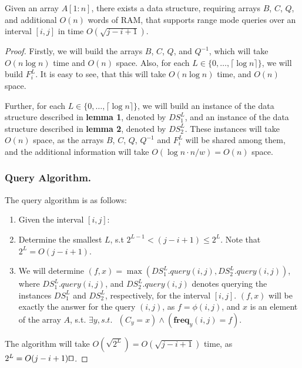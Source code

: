 \documentclass[runningheads]{llncs}
\begin{document}
\begin{theorem} 
    Given an array $A[1:n]$, there exists a data structure, requiring arrays $B$, $C$, $Q$, and additional $O(n)$ words of RAM, that supports 
    range mode queries over an interval $[i,j]$ in time $O(\sqrt{j-i+1})$.
\end{theorem}
\begin{proof}
    Firstly, we will build the arrays $B$, $C$, $Q$, and $Q^{-1}$, which will take $O(n\log n)$ time and $O(n)$ space. 
    Also, for each $L\in \{0,\dots,\lceil \log n \rceil\}$, we will build $F^L_i$. It is easy to see, that this will take $O(n\log n)$ time, 
    and $O(n)$ space.

    Further, for each $L\in \{0,\dots,\lceil \log n \rceil\}$, we will build an instance of the data structure described in \textbf{lemma 1}, denoted by $DS_1^L$, and an instance of the data structure 
    described in \textbf{lemma 2}, denoted by $DS_2^L$. These instances will take $O(n)$ space, as the arrays $B$, $C$, $Q$, $Q^{-1}$ and $F^L_{i}$ will be shared among them, and the additional information 
    will take $O(\log n \cdot n/w) = O(n)$ space.

    \subsubsection{Query Algorithm.} The query algorithm is as follows:
        \begin{enumerate}
        
            \item[] Given the interval $[i,j]$:
            
            \item Determine the smallest $L$, s.t $2^{L-1}< (j-i+1) \leq 2^L$. Note that $2^L=O(j-i+1)$.
            
            \item We will determine $(f, x)=\max( DS_1^L.query(i,j) , DS_2^L.query(i,j) )$, where $DS_1^L.query(i,j)$, and $DS_2^L.query(i,j)$ denotes querying the instances $DS_1^L$ and $DS_2^L$, respectively, for the interval $[i,j]$.
             $(f,x)$ will be exactly the answer for the query $(i,j)$, as $f=\phi(i,j)$, and $x$ is an element of the array $A$, s.t. $\exists y, s.t.\text{ } (C_y=x) \land (\textbf{freq}_y(i,j)=f)$.

        
        \end{enumerate}

        The algorithm will take $O(\sqrt{2^L})=O(\sqrt{j-i+1})$ time, as $2^L=O(j-i+1) \qed $. 

\end{proof}
\end{document}
